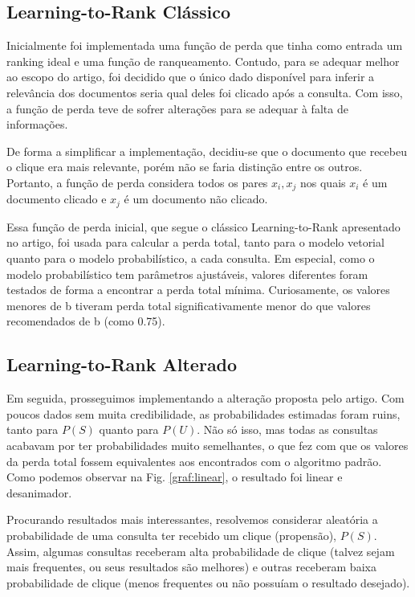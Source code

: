 \documentclass{svproc}
\begin{document}
\subsection{Learning-to-Rank Clássico}
Inicialmente foi implementada uma função de perda que tinha como entrada um ranking ideal e uma função de ranqueamento.
Contudo, para se adequar melhor ao escopo do artigo, foi decidido que o único dado disponível para inferir a relevância dos
documentos seria qual deles foi clicado após a consulta. Com isso, a função de perda teve de sofrer alterações para se 
adequar à falta de informações.

De forma a simplificar a implementação, decidiu-se que o documento que recebeu o clique era mais relevante, porém não se 
faria distinção entre os outros. Portanto, a função de perda considera todos os pares $x_i, x_j$ nos quais $x_i$ é um 
documento clicado e $x_j$ é um documento não clicado.

Essa função de perda inicial, que segue o clássico Learning-to-Rank apresentado no artigo, foi usada para 
calcular a perda total, tanto para o modelo vetorial quanto para o modelo probabilístico, a cada consulta. 
Em especial, como o modelo probabilístico tem parâmetros ajustáveis, valores diferentes foram testados de forma
a encontrar a perda total mínima. Curiosamente, os valores menores de b tiveram perda total significativamente menor do que
valores recomendados de b (como 0.75).

\subsection{Learning-to-Rank Alterado}

Em seguida, prosseguimos implementando a alteração proposta pelo artigo. Com poucos dados sem muita credibilidade, as
probabilidades estimadas foram ruins, tanto para $P(S)$ quanto para $P(U)$. Não só isso, mas todas as consultas acabavam
por ter probabilidades muito semelhantes, o que fez com que os valores da perda total fossem equivalentes aos encontrados
com o algoritmo padrão. Como podemos observar na Fig. \ref{graf:linear}, o resultado foi linear e desanimador.

Procurando resultados mais interessantes, resolvemos considerar aleatória a probabilidade de uma consulta ter recebido um
clique (propensão), $P(S)$. Assim, algumas consultas receberam alta probabilidade de clique (talvez sejam mais frequentes, ou seus 
resultados são melhores) e outras receberam baixa probabilidade de clique (menos frequentes ou não possuíam o resultado 
desejado).
\end{document}
